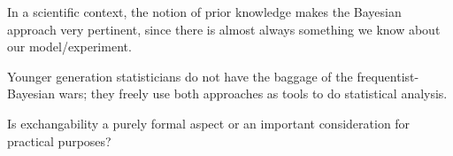   \I 
In a scientific context, the notion of prior knowledge makes the Bayesian approach very pertinent, since there is almost always something we know about our model/experiment. 

  \I Younger generation statisticians do not have the baggage of the frequentist-Bayesian wars;
    they freely use both approaches as tools to do statistical analysis. 

  \I Is exchangability a purely formal aspect or an important consideration for practical
    purposes? 
\ei


